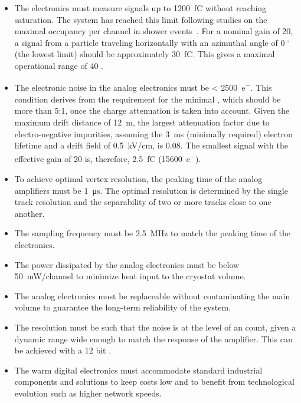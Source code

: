 \begin{itemize}

\item{The  electronics must measure signals up to \SI{1200}{\femto\coulomb} without reaching saturation. The system has reached this limit following  studies on the maximal occupancy per channel in shower events~\cite{WA105-TDR}. For a nominal  gain of \num{20}, a  signal from a particle traveling horizontally with an azimuthal angle of $\SI{0}{^\circ}$ (the lowest limit) should be approximately \SI{30}{fC}. This gives  a maximal operational range of \num{40} .}

\item{The electronic noise in the  analog electronics must be \SI{< 2500}{e^{-}}. This condition derives from the requirement for the minimal , which should be more than \num{5}:\num{1}, once the charge attenuation is taken into account. Given the maximum drift distance of \SI{12}{\meter}, the largest attenuation factor due to electro-negative impurities, assuming the \SI{3}{\milli\second} (minimally required) electron lifetime and a drift field of \SI{0.5}{\kilo\volt/\cm}, is \num{0.08}. The smallest  signal with the  effective gain of \num{20} is, therefore, \SI{2.5}{\femto\coulomb} (\SI{15600}{e^{-}}).}

\item{To achieve optimal vertex resolution, the peaking time of the  analog amplifiers must be \SI{1}{\micro\second}. The optimal resolution is determined by the single track resolution and the separability of two or more tracks close to one another.}

\item{The sampling frequency must be \SI{2.5}{\MHz} to match the peaking time of the  electronics.}

\item{The power dissipated by the  analog electronics must be below \SI{50}{\milli\watt/channel} to minimize heat input to the cryostat volume.}

\item{The  analog electronics must be replaceable without contaminating the main  volume to guarantee the long-term reliability of the system.}

\item{The  resolution must be such that the noise is at the level of an  count, given a dynamic range wide enough to match the response of the  amplifier. This can be achieved with a \num{12} bit .} 

\item{%
The warm digital electronics must accommodate standard industrial components and solutions to keep costs low and to benefit from technological evolution such as higher network speeds.}
\end{itemize}
